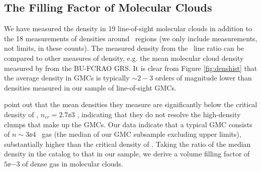 




\subsection{The Filling Factor of Molecular Clouds}
\label{sec:gmcdensity}
We have measured the density in 19 line-of-sight molecular clouds in addition
to the 18 measurements of densities around \uchii\ regions (we only include
measurements, not limits, in these counts).  The measured density from the
\formaldehyde\ line ratio can be compared to other measures of density, e.g.
the mean molecular cloud density measured by \citet{Roman-Duval2010} from the
BU-FCRAO GRS.  It is clear from Figure \ref{fig:denshist} that the average
density in GMCs is typically $\sim2-3$ orders of magnitude lower than densities
measured in our sample of line-of-sight GMCs.

\citet{Roman-Duval2010} point out that the mean densities they measure are
significantly below the critical density of \thirteenco,
$n_{cr}=2.7\ee{3}$ \percc, indicating that they do not resolve the high-density
clumps that make up the GMCs.  Our data indicate that a typical GMC consists of
$n\sim3\ee{4}$ \percc\ gas (the median of our GMC subsample excluding upper
limits), substantially higher than the critical density of \thirteenco.  Taking
the ratio of the median density in the \citet{Roman-Duval2010} catalog to that
in our sample, we derive a volume filling factor of $5\ee{-3}$ of dense gas in
molecular clouds.  

